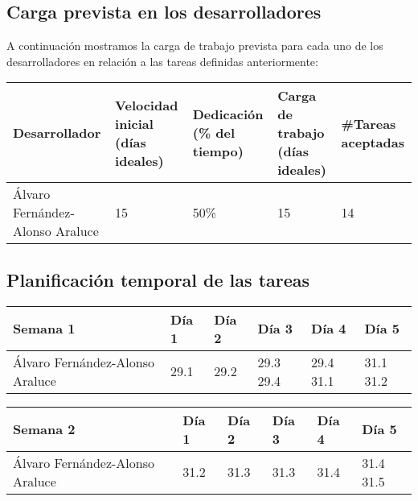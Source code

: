 \subsection{Carga prevista en los desarrolladores}

A continuación mostramos la carga de trabajo prevista para cada uno de los desarrolladores en relación a las tareas definidas anteriormente:

\begin{table}[h]
	\centering
	\begin{tabular}{| p{3cm} | p{2cm} | p{2cm} | p{2cm} | p{2cm} |}
		\rowcolor[HTML]{329A9D} 
		{\color[HTML]{FFFFFF} \textbf{Desarrollador}} & {\color[HTML]{FFFFFF} \textbf{Velocidad inicial (días ideales)}} & {\color[HTML]{FFFFFF} \textbf{Dedicación (\% del tiempo)}} & {\color[HTML]{FFFFFF} \textbf{Carga de trabajo (días ideales)}} & {\color[HTML]{FFFFFF} \textbf{\#Tareas aceptadas}}  \\ \hline
		Álvaro Fernández-Alonso Araluce & 15 & 50\% & 15 & 14 \\ \hline
	\end{tabular}
\end{table}

\newpage

\subsection{Planificación temporal de las tareas}

\begin{table}[h]
	\centering
	\begin{tabular}{| p{2cm} | p{2cm} | p{2cm} | p{2cm} | p{2cm} | p{2cm} |}
		\rowcolor[HTML]{329A9D} 
		{\color[HTML]{FFFFFF} \textbf{Semana 1}} & {\color[HTML]{FFFFFF} \textbf{Día 1}} & {\color[HTML]{FFFFFF} \textbf{Día 2}} & {\color[HTML]{FFFFFF} \textbf{Día 3}} & {\color[HTML]{FFFFFF} \textbf{Día 4}}  & {\color[HTML]{FFFFFF} \textbf{Día 5}} \\ \hline
		Álvaro Fernández-Alonso Araluce & 29.1 & 29.2 & 29.3 29.4 & 29.4 31.1 & 31.1 31.2 \\ \hline
	\end{tabular}
\end{table}

\begin{table}[h]
	\centering
	\begin{tabular}{| p{2cm} | p{2cm} | p{2cm} | p{2cm} | p{2cm} | p{2cm} |}
		\rowcolor[HTML]{329A9D} 
		{\color[HTML]{FFFFFF} \textbf{Semana 2}} & {\color[HTML]{FFFFFF} \textbf{Día 1}} & {\color[HTML]{FFFFFF} \textbf{Día 2}} & {\color[HTML]{FFFFFF} \textbf{Día 3}} & {\color[HTML]{FFFFFF} \textbf{Día 4}}  & {\color[HTML]{FFFFFF} \textbf{Día 5}} \\ \hline
		Álvaro Fernández-Alonso Araluce & 31.2 & 31.3 & 31.3 & 31.4 & 31.4 31.5 \\ \hline
	\end{tabular}
\end{table}

